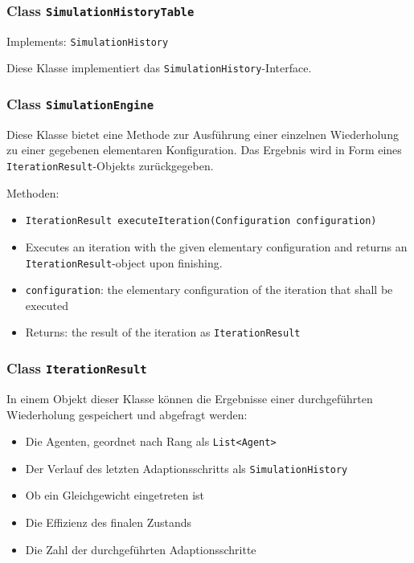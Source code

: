 \documentclass[parskip=full,11pt]{scrartcl}
\begin{document}
\subsubsection{Class \texttt{SimulationHistoryTable}}
Implements: \texttt{SimulationHistory}

Diese Klasse implementiert das \texttt{SimulationHistory}-Interface.

\subsubsection{Class \texttt{SimulationEngine}}

Diese Klasse bietet eine Methode zur Ausführung einer einzelnen Wiederholung zu einer gegebenen elementaren Konfiguration. Das Ergebnis wird in Form eines \texttt{IterationResult}-Objekts zurückgegeben.

Methoden:
\begin{itemize}\itemsep -10pt
\item \texttt{IterationResult executeIteration(Configuration configuration)}
\item[] Executes an iteration with the given elementary configuration and returns an \texttt{IterationResult}-object upon finishing.
\item[] \texttt{configuration}: the elementary configuration of the iteration that shall be executed
\item[] Returns: the result of the iteration as \texttt{IterationResult}
\end{itemize}

\subsubsection{Class \texttt{IterationResult}}
In einem Objekt dieser Klasse können die Ergebnisse einer durchgeführten Wiederholung gespeichert und abgefragt werden:
\begin{itemize}\itemsep -10pt
\item Die Agenten, geordnet nach Rang als \texttt{List<Agent>}
\item Der Verlauf des letzten Adaptionsschritts als \texttt{SimulationHistory}
\item Ob ein Gleichgewicht eingetreten ist
\item Die Effizienz des finalen Zustands
\item Die Zahl der durchgeführten Adaptionsschritte
\end{itemize}
\end{document}
